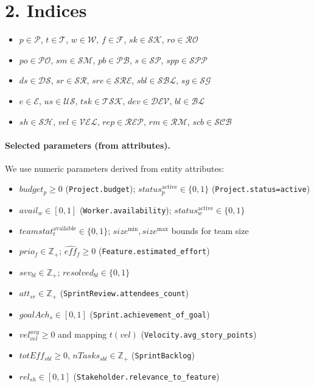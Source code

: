 \documentclass[11pt,a4paper]{article}
\begin{document}
\section{2. Indices}
\begin{itemize}[leftmargin=2em]
  \item $p\in\mathcal{P}$, $t\in\mathcal{T}$, $w\in\mathcal{W}$, $f\in\mathcal{F}$, $sk\in\mathcal{S\!K}$, $ro\in\mathcal{R\!O}$
  \item $po\in\mathcal{P\!O}$, $sm\in\mathcal{S\!M}$, $pb\in\mathcal{P\!B}$, $s\in\mathcal{S\!P}$, $spp\in\mathcal{S\!PP}$
  \item $ds\in\mathcal{D\!S}$, $sr\in\mathcal{S\!R}$, $sre\in\mathcal{S\!RE}$, $sbl\in\mathcal{S\!B\!L}$, $sg\in\mathcal{S\!G}$
  \item $e\in\mathcal{E}$, $us\in\mathcal{U\!S}$, $tsk\in\mathcal{T\!S\!K}$, $dev\in\mathcal{D\!E\!V}$, $bl\in\mathcal{B\!L}$
  \item $sh\in\mathcal{S\!H}$, $vel\in\mathcal{V\!E\!L}$, $rep\in\mathcal{R\!E\!P}$, $rm\in\mathcal{R\!M}$, $scb\in\mathcal{S\!C\!B}$
\end{itemize}

\paragraph{Selected parameters (from attributes).} We use numeric parameters derived from entity attributes:
\begin{itemize}[leftmargin=2em]
  \item $budget_p\ge 0$ (\texttt{Project.budget}); $status^\text{active}_p\in\{0,1\}$ (\texttt{Project.status=active})
  \item $avail_w\in[0,1]$ (\texttt{Worker.availability}); $status^\text{active}_w\in\{0,1\}$
  \item $teamstat^\text{available}_t\in\{0,1\}$; $size^{\min},size^{\max}$ bounds for team size
  \item $prio_f\in\mathbb{Z}_{+}$; $\widehat{eff}_f\ge 0$ (\texttt{Feature.estimated\_effort})
  \item $sev_{bl}\in\mathbb{Z}_{+}$; $resolved_{bl}\in\{0,1\}$
  \item $att_{sr}\in\mathbb{Z}_{+}$ (\texttt{SprintReview.attendees\_count})
  \item $goalAch_s\in[0,1]$ (\texttt{Sprint.achievement\_of\_goal})
  \item $vel^{avg}_{vel}\ge 0$ and mapping $t(vel)$ (\texttt{Velocity.avg\_story\_points})
  \item $totEff_{sbl}\ge 0$, $nTasks_{sbl}\in\mathbb{Z}_{+}$ (\texttt{SprintBacklog})
  \item $rel_{sh}\in[0,1]$ (\texttt{Stakeholder.relevance\_to\_feature})
\end{itemize}
\end{document}
